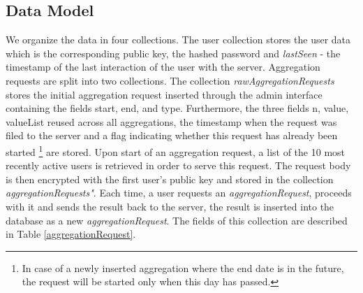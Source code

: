 \subsection{Data Model}\label{server-data-model}
We organize the data in four collections. The user collection stores the user data which is the corresponding public key, the hashed password and \textit{lastSeen} - the timestamp of the last interaction of the user with the server. Aggregation requests are split into two collections. The collection \textit{rawAggregationRequests} stores the initial aggregation request inserted through the admin interface containing the fields start, end, and type. Furthermore, the three fields n, value, valueList reused across all aggregations, the timestamp when the request was filed to the server and a flag indicating whether this request has already been started \footnote{In case of a newly inserted aggregation where the end date is in the future, the request will be started only when this day has passed.} are stored. Upon start of an aggregation request, a list of the 10 most recently active users is retrieved in order to serve this request. The request body is then encrypted with the first user's public key and stored in the collection \textit{aggregationRequests"}. Each time, a user requests an \textit{aggregationRequest}, proceeds with it and sends the result back to the server, the result is inserted into the database as a new \textit{aggregationRequest}. The fields of this collection are described in Table \ref{aggregationRequest}.

